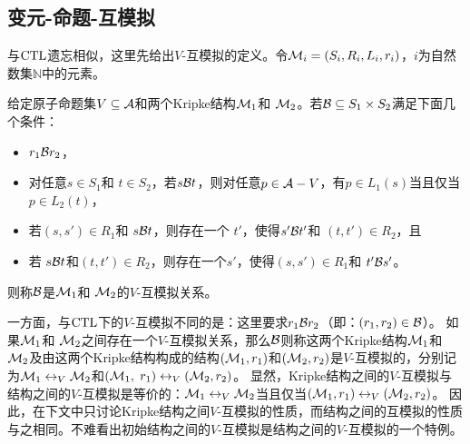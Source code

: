 \subsection{变元-命题-互模拟}
与$\textrm{CTL}$遗忘相似，这里先给出$V$-互模拟的定义。令${\cal M}_i = (S_i, R_i, L_i, r_i)$，$i$为自然数集$\mathbb{N}$中的元素。
\begin{definition}[$V$-互模拟]\label{def:VB}
	给定原子命题集$V \subseteq {\cal A}$和两个Kripke结构${\cal M}_1$和 ${\cal M}_2$。若${\cal B}\subseteq S_1 \times S_2$满足下面几个条件：
	\begin{itemize}
		\item $r_1 {\cal B} r_2$，
		\item 对任意$s\in S_1$和 $t\in S_2$，若$s {\cal B} t$，则对任意$p \in {\cal A}- V$，有$p \in L_1(s)$当且仅当 $p \in L_2(t)$，
		\item 若$(s, s')\in R_1$和 $s {\cal B} t$，则存在一个 $t'$，使得$s' {\cal B} t'$和 $(t, t')\in R_2$，且
		\item 若 $s {\cal B} t$和$(t, t')\in R_2$，则存在一个$s'$，使得$(s, s')\in R_1$和 $t' {\cal B} s'$。
	\end{itemize}
则称${\cal B}$是${\cal M}_1$和 ${\cal M}_2$的$V$-互模拟关系。
\end{definition}

一方面，与$\textrm{CTL}$下的$V$-互模拟不同的是：这里要求$r_1 {\cal B} r_2$（即：$(r_1,r_2)\in {\cal B}$）。
如果${\cal M}_1$和 ${\cal M}_2$之间存在一个$V$-互模拟关系，那么${\cal B}$则称这两个Kripke结构${\cal M}_1$和 ${\cal M}_2$及由这两个Kripke结构构成的结构$({\cal M}_1,r_1)$和$({\cal M}_2,r_2)$是$V$-互模拟的，分别记为${\cal M}_1 \leftrightarrow_V {\cal M}_2$和$({\cal M}_1,$ $r_1) \leftrightarrow_V ({\cal M}_2,r_2)$。
显然，Kripke结构之间的$V$-互模拟与结构之间的$V$-互模拟是等价的：${\cal M}_1 \leftrightarrow_V {\cal M}_2$当且仅当$({\cal M}_1,r_1) \leftrightarrow_V ({\cal M}_2,r_2)$。 因此，在下文中只讨论Kripke结构之间$V$-互模拟的性质，而结构之间的互模拟的性质与之相同。不难看出初始结构之间的$V$-互模拟是结构之间的$V$-互模拟的一个特例。


